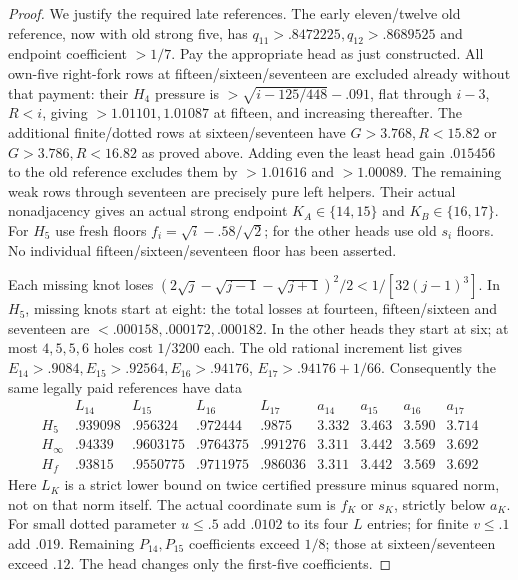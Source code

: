 \documentclass[11pt]{article}
\theoremstyle{definition}
\theoremstyle{remark}
\begin{document}
\begin{proof}
We justify the required late references. The early eleven/twelve
old reference, now with old strong five, has
$q_{11}>.8472225,q_{12}>.8689525$ and endpoint coefficient
$>1/7$. Pay the appropriate head as just constructed.
All own-five right-fork rows at fifteen/sixteen/seventeen are
excluded already without that payment: their $H_4$ pressure
is $>\sqrt{i-125/448}-.091$, flat through $i-3$, $R<i$,
giving $>1.01101,1.01087$ at fifteen, and increasing thereafter.
The additional finite/dotted rows at sixteen/seventeen have
$G>3.768,R<15.82$ or $G>3.786,R<16.82$ as proved above.
Adding even the least head gain $.015456$ to the old reference
excludes them by $>1.01616$ and $>1.00089$.
The remaining weak rows through seventeen are precisely pure
left helpers. Their actual nonadjacency gives an actual strong
endpoint $K_A\in\{14,15\}$ and $K_B\in\{16,17\}$.
For $H_5$ use fresh floors $f_i=\sqrt i-.58/\sqrt2$;
for the other heads use old $s_i$ floors. No individual
fifteen/sixteen/seventeen floor has been asserted.

Each missing knot loses
$(2\sqrt j-\sqrt{j-1}-\sqrt{j+1})^2/2
<1/[32(j-1)^3]$. In $H_5$, missing knots start at eight:
the total losses at fourteen, fifteen/sixteen and seventeen
are $<.000158,.000172,.000182$.
In the other heads they start at six; at most $4,5,5,6$
holes cost $1/3200$ each. The old rational increment list gives
$E_{14}>.9084,E_{15}>.92564,E_{16}>.94176$,
$E_{17}>.94176+1/66$.
Consequently the same legally paid references have data
\[
\begin{array}{c|rrrr|rrrr}
 &L_{14}&L_{15}&L_{16}&L_{17}
 &a_{14}&a_{15}&a_{16}&a_{17}\\\hline
H_5&.939098&.956324&.972444&.9875&3.332&3.463&3.590&3.714\\
H_\infty&.94339&.9603175&.9764375&.991276&3.311&3.442&3.569&3.692\\
H_f&.93815&.9550775&.9711975&.986036&3.311&3.442&3.569&3.692
\end{array}
\]
Here $L_K$ is a strict lower bound on twice certified pressure
minus squared norm, not on that norm itself. The actual coordinate
sum is $f_K$ or $s_K$, strictly below $a_K$.
For small dotted parameter $u\le.5$ add $.0102$ to its four
$L$ entries; for finite $v\le.1$ add $.019$.
Remaining $P_{14},P_{15}$ coefficients exceed $1/8$;
those at sixteen/seventeen exceed $.12$. The head changes
only the first-five coefficients.


\end{proof}
\end{document}
